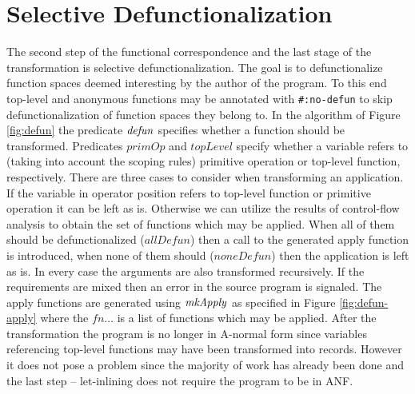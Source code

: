 \section{Selective Defunctionalization}\label{sec:selective-defun}
The second step of the functional correspondence and the last stage of the transformation is selective defunctionalization.
The goal is to defunctionalize function spaces deemed interesting by the author of the program.
To this end top-level and anonymous functions may be annotated with \lstinline!#:no-defun! to skip defunctionalization of function spaces they belong to.
In the algorithm of Figure \ref{fig:defun} the predicate $\mathit{defun}$ specifies whether a function should be transformed.
Predicates $\mathit{primOp}$ and $\mathit{topLevel}$ specify whether a variable refers to (taking into account the scoping rules) primitive operation or top-level function, respectively.
There are three cases to consider when transforming an application.
If the variable in operator position refers to top-level function or primitive operation it can be left as is.
Otherwise we can utilize the results of control-flow analysis to obtain the set of functions which may be applied.
When all of them should be defunctionalized ($\mathit{allDefun}$) then a call to the generated apply function is introduced, when none of them should ($\mathit{noneDefun}$) then the application is left as is.
In every case the arguments are also transformed recursively.
If the requirements are mixed then an error in the source program is signaled.
The apply functions are generated using $\mathit{mkApply}$ as specified in Figure \ref{fig:defun-apply} where the $\mathit{fn}\ldots$ is a list of functions which may be applied.
After the transformation the program is no longer in A-normal form since variables referencing top-level functions may have been transformed into records.
However it does not pose a problem since the majority of work has already been done and the last step -- let-inlining does not require the program to be in ANF.



